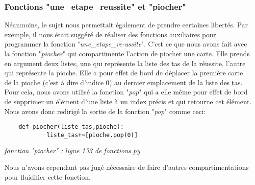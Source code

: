 \documentclass[10pt,a4paper,french,titlepage]{article}
\theoremstyle{definition}
\begin{document}
\subsubsection{Fonctions "une\_etape\_reussite" et "piocher"}
Néanmoins, le sujet nous permettait également de prendre certaines libertés. Par exemple, il nous était suggéré de réaliser des fonctions auxiliaires pour programmer la fonction "\textit{une\_etape\_re-\linebreak[4]ussite}". C'est ce que nous avons fait avec la fonction "\textit{piocher}" qui compartimente l'action de piocher une carte. Elle prends en argument deux listes, une qui représente la liste des tas de la réussite, l'autre qui représente la pioche. Elle a  pour effet de bord de déplacer la première carte de la pioche (c'est à dire d'indice 0) au dernier emplacement de la liste des tas. Pour cela, nous  avons utilisé la fonction "\textit{pop}" qui a elle même pour effet de bord de supprimer un élément d'une liste à un index précis et qui retourne cet élément. Nous avons donc redirigé la sortie de la fonction "\textit{pop}" comme ceci:\\
\begin{lstlisting}
	def piocher(liste_tas,pioche):
    		liste_tas+=[pioche.pop(0)]

\end{lstlisting}
\begin{center}
\textit{fonction "piocher" : ligne 133 de fonctions.py}
\end{center}

Nous n'avons cependant pas jugé nécessaire de faire d'autres compartimentations pour fluidifier cette fonction.
\end{document}
